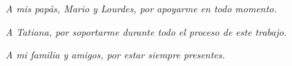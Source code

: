 \chapter*{\phantom{Dedicatoria}}

\hfil \textit{A mis papás, Mario y Lourdes, por apoyarme en todo momento.} \hfil

\hfil \textit{A Tatiana, por soportarme durante todo el proceso de este trabajo.} \hfil

\hfil \textit{A mi familia y amigos, por estar siempre presentes.} \hfil


